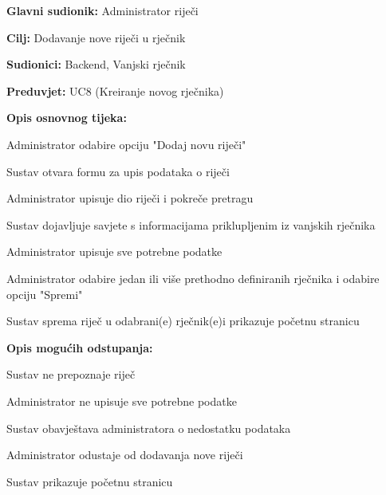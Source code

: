 						\noindent {}
					\begin{packed_item}
						
						\item \textbf{Glavni sudionik: } Administrator riječi
						\item  \textbf{Cilj:} Dodavanje nove riječi u rječnik
						\item  \textbf{Sudionici:} Backend, Vanjski rječnik
						\item  \textbf{Preduvjet:} UC8 (Kreiranje novog rječnika)
						\item  \textbf{Opis osnovnog tijeka:}
						
						\item[] \begin{packed_enum}
							
							\item Administrator odabire opciju "Dodaj novu riječi"
							\item Sustav otvara formu za upis podataka o riječi 
							\item Administrator upisuje dio riječi i pokreče pretragu
							\item Sustav dojavljuje savjete s informacijama priklupljenim iz vanjskih rječnika
							\item Administrator upisuje sve potrebne podatke
							\item Administrator odabire jedan ili više prethodno definiranih rječnika i odabire opciju "Spremi"
							\item Sustav sprema riječ u odabrani(e) rječnik(e)i prikazuje početnu stranicu
						\end{packed_enum}
						
						\item  \textbf{Opis mogućih odstupanja:}
						
						\item[] \begin{packed_item}
							
							\item[4.a] Sustav ne prepoznaje riječ
							\item[5.a] Administrator ne upisuje sve potrebne podatke
							\item[] \begin{packed_enum}
								
								\item Sustav obavještava administratora o nedostatku podataka
								
							\end{packed_enum}	
							
							\item[6.a] Administrator odustaje od dodavanja nove riječi
							\item[] \begin{packed_enum}
								
								\item Sustav prikazuje početnu stranicu
								
							\end{packed_enum}
							
						\end{packed_item}
					\end{packed_item}

